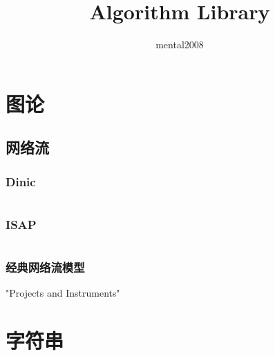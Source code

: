 \documentclass[a4paper,fleqn,11pt]{article}
\author{mental2008}
\title{Algorithm Library}
\begin{document}
 
\maketitle %

\newpage %
\tableofcontents %

\newpage
\section{图论} %

\subsection{网络流}

\subsubsection{Dinic}
\inputminted[breaklines]{c++}{graph/Dinic.cpp}

\subsubsection{ISAP}
\inputminted[breaklines]{c++}{graph/ISAP.cpp}

\subsubsection{经典网络流模型}

"Projects and Instruments"





\newpage
\section{字符串}
\end{document}
